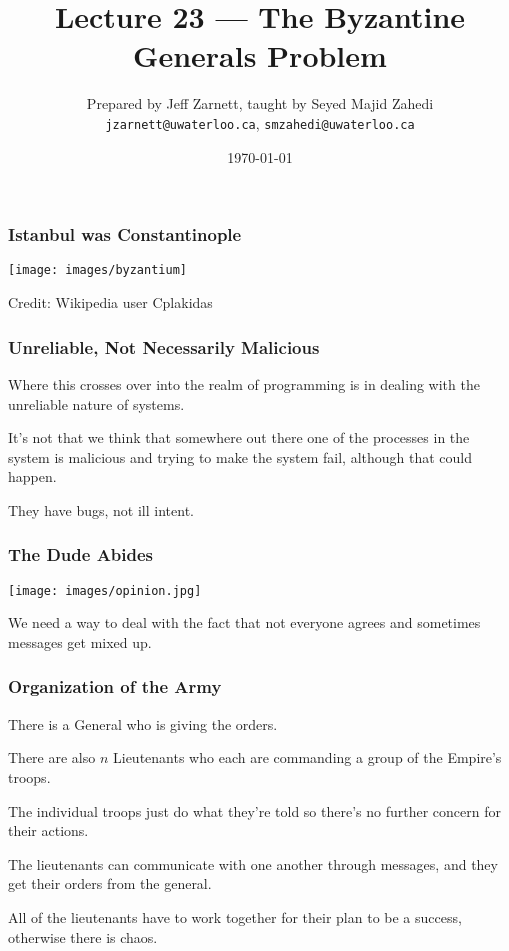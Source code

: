 

\title{Lecture 23 --- The Byzantine Generals Problem }

\author{Prepared by Jeff Zarnett, taught by Seyed Majid Zahedi \\ \small \texttt{jzarnett@uwaterloo.ca}, \texttt{smzahedi@uwaterloo.ca}}

\date{\today}




\begin{frame}
	\titlepage

\end{frame}


\begin{frame}
	\frametitle{Istanbul was Constantinople}

	\begin{center}
		\texttt{[image: images/byzantium]}
	\end{center}

	Credit: Wikipedia user Cplakidas


\end{frame}

\begin{frame}
	\frametitle{Unreliable, Not Necessarily Malicious}

	Where this crosses over into the realm of programming is in dealing with the unreliable nature of systems.

	It's not that we think that somewhere out there one of the processes in the system is malicious and trying to make the system fail, although that could happen.

	They have bugs, not ill intent.
\end{frame}


\begin{frame}
	\frametitle{The Dude Abides}
	\begin{center}
		\texttt{[image: images/opinion.jpg]}
	\end{center}

	We need a way to deal with the fact that not everyone agrees and sometimes messages get mixed up.

\end{frame}

\begin{frame}
	\frametitle{Organization of the Army}

	There is a \alert{General} who is giving the orders.

	There are also $n$ \alert{Lieutenants} who each are commanding a group of the Empire's troops.

	The individual troops just do what they're told so there's no further concern for their actions.

	The lieutenants can communicate with one another through messages, and they get their orders from the general.

	All of the lieutenants have to work together for their plan to be a success, otherwise there is chaos.
\end{frame}


